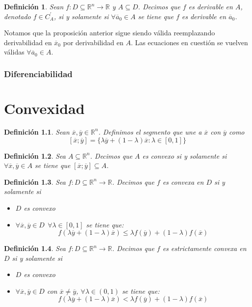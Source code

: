 \documentclass[11pt]{report}
\newtheorem{definition}{Definición}[section]
\newcommand{\Rn}{\mathbb{R}^{n}}
\newcommand{\R}{\mathbb{R}}
\newcommand{\azv}{\overline{a}_{0}}
\newcommand{\x}{\overline{x}}
\newcommand{\xz}{\overline{x}_{0}}
\newcommand{\y}{\overline{y}}
\begin{document}
\begin{definition} Sean $f:D\subseteq\Rn\rightarrow\R$ y $A\subseteq D$. Decimos que $f$ es derivable en $A$, denotado $f\in C_{A}^{'}$, si y solamente si $\forall\azv\in A$ se tiene que $f$ es derivable en $\azv$.
\end{definition}
Notamos que la proposición anterior sigue siendo válida reemplazando derivabilidad en $\xz$ por derivabilidad en $A$. Las ecuaciones en cuestión se vuelven válidas $\forall\azv\in A$.

\subsection{Diferenciabilidad}

\chapter{Convexidad}
\begin{definition}
Sean $\x,\y\in\Rn$. Definimos el segmento que une a $\x$ con $\y$ como
$$[\x;\y] = \{\lambda\y + (1-\lambda)\x: \lambda\in [0,1]\}$$
\end{definition}

\begin{definition}
Sea $A\subseteq \mathbb{R}^{n}$. Decimos que $A$ es convexo si y solamente si $\forall\overline{x}, \overline{y}\in A$ se tiene que $[\overline{x}; \overline{y}]\subseteq A$.
\end{definition}

\begin{definition}
Sea $f:D\subseteq\Rn\rightarrow\R$. Decimos que $f$ es convexa en $D$ si y solamente si
\begin{itemize}
\item[(i)] $D$ es convexo
\item[(ii)] $\forall\x,\y\in D\ \ \forall\lambda\in [0, 1]$ se tiene que: $$f(\lambda\y+(1-\lambda)\x)\leq\lambda f(\y)+(1-\lambda)f(\x)$$
\end{itemize}
\end{definition}

\begin{definition}
Sea $f:D\subseteq\Rn\rightarrow\R$. Decimos que $f$ es estrictamente convexa en $D$ si y solamente si
\begin{itemize}
\item[(i)] $D$ es convexo
\item[(ii)] $\forall\x,\y\in D$ con $\x\ne\y$, $\forall\lambda\in (0, 1)$ se tiene que: $$f(\lambda\y+(1-\lambda)\x)<\lambda f(\y)+(1-\lambda)f(\x)$$
\end{itemize}
\end{definition}
\end{document}

